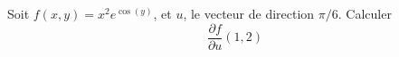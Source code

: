 
\begin{exercice}\label{exoOutilsMath-0044}

    Soit $f(x,y)=x^2 e^{\cos(y)}$, et $u$, le vecteur de direction $\pi/6$. Calculer
    \begin{equation}
        \frac{ \partial f }{ \partial u }(1,2)
    \end{equation}
    
\end{exercice}
